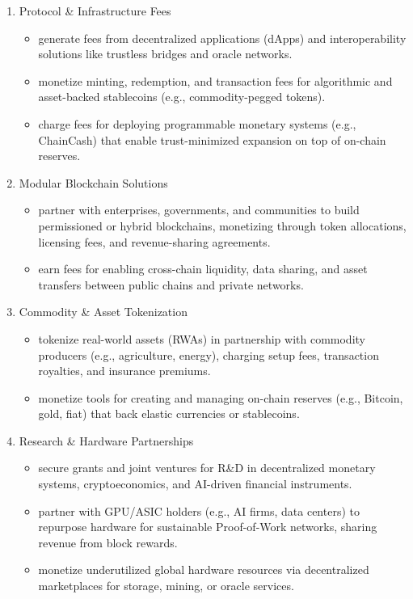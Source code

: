 \documentclass{llncs}   %
\begin{document}
\begin{enumerate}
\item Protocol \& Infrastructure Fees
\begin{itemize}
  \item generate fees from decentralized applications (dApps) and interoperability solutions like trustless bridges and oracle networks.
  \item monetize minting, redemption, and transaction fees for algorithmic and asset-backed stablecoins (e.g., commodity-pegged tokens).
  \item charge fees for deploying programmable monetary systems (e.g., ChainCash) that enable trust-minimized expansion on top of on-chain reserves.
\end{itemize}

\item Modular Blockchain Solutions
\begin{itemize}
  \item partner with enterprises, governments, and communities to build permissioned or hybrid blockchains, monetizing through token allocations, licensing fees, and revenue-sharing agreements.
  \item earn fees for enabling cross-chain liquidity, data sharing, and asset transfers between public chains and private networks.
\end{itemize}

\item Commodity \& Asset Tokenization
\begin{itemize}
  \item tokenize real-world assets (RWAs) in partnership with commodity producers (e.g., agriculture, energy), charging setup fees, transaction royalties, and insurance premiums.
  \item monetize tools for creating and managing on-chain reserves (e.g., Bitcoin, gold, fiat) that back elastic currencies or stablecoins.
\end{itemize}

\item Research \& Hardware Partnerships
\begin{itemize}
  \item secure grants and joint ventures for R\&D in decentralized monetary systems, cryptoeconomics, and AI-driven financial instruments.
  \item partner with GPU/ASIC holders (e.g., AI firms, data centers) to repurpose hardware for sustainable Proof-of-Work networks, sharing revenue from block rewards.
  \item monetize underutilized global hardware resources via decentralized marketplaces for storage, mining, or oracle services.
\end{itemize}


\end{enumerate}
\end{document}
